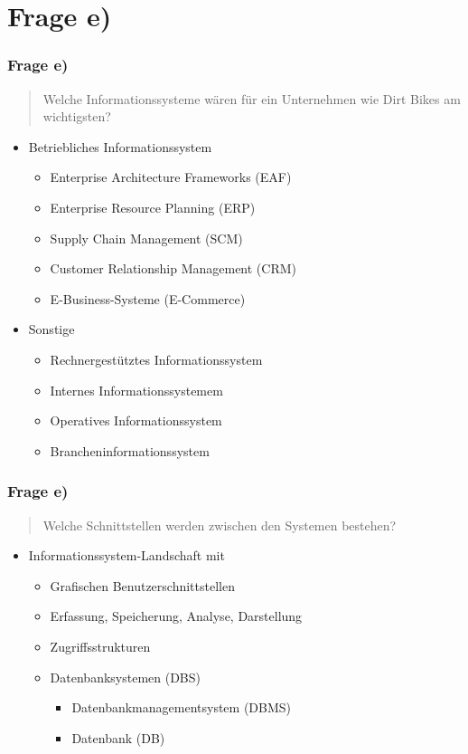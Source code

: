\documentclass{beamer}
\begin{document}
\section{Frage e)}
\begin{frame}
\frametitle{Frage e)}

\begin{quote}
Welche Informationssysteme wären für ein Unternehmen wie Dirt Bikes am wichtigsten?
\end{quote}

\begin{itemize}
\setlength{\itemsep}{14pt}
\item Betriebliches Informationssystem
\begin{itemize}
\item Enterprise Architecture Frameworks (EAF)
\item Enterprise Resource Planning (ERP)
\item Supply Chain Management (SCM)
\item Customer Relationship Management (CRM)
\item E-Business-Systeme (E-Commerce)
\end{itemize}
\item Sonstige
\begin{itemize}
\item Rechnergest\"utztes Informationssystem
\item Internes Informationssystemem
\item Operatives Informationssystem
\item Brancheninformationssystem
\end{itemize}
\end{itemize}

\end{frame}

\begin{frame}
\frametitle{Frage e)}

\begin{quote}
Welche Schnittstellen werden zwischen den Systemen bestehen?
\end{quote}

\begin{itemize}
\item Informationssystem-Landschaft mit
\begin{itemize}
\setlength{\itemsep}{8pt}
\item Gra­fi­schen Benut­zer­schnitt­stel­len
\item Erfassung, Speicherung, Analyse, Darstellung
\item Zugriffsstrukturen
\item Datenbanksystemen (DBS)
\begin{itemize}
\item Datenbankmanagementsystem (DBMS)
\item Datenbank (DB)
\end{itemize}
\end{itemize}
\end{itemize}

\end{frame}
\end{document}
